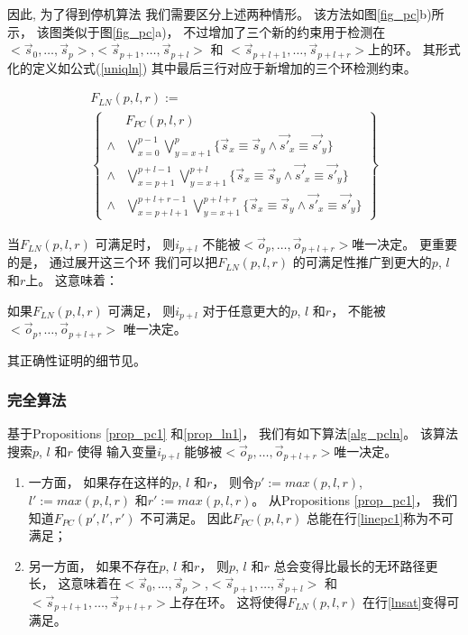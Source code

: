因此,
为了得到停机算法
我们需要区分上述两种情形。
该方法如图\ref{fig_pc}b)所示，
该图类似于图\ref{fig_pc}a)，
不过增加了三个新的约束用于检测在$<\vec{s}_{0},\dots,\vec{s}_{p}>$,$<\vec{s}_{p+1},\dots,\vec{s}_{p+l}>$ 和
$<\vec{s}_{p+l+1},\dots,\vec{s}_{p+l+r}>$上的环。
其形式化的定义如公式(\ref{uniqln})
其中最后三行对应于新增加的三个环检测约束。

\begin{multline}\label{uniqln}
F_{LN}(p,l,r):=\\
\left\{
\begin{array}{cc}
&F_{PC}(p,l,r)\\
\wedge&\bigvee_{x=0}^{p-1}\bigvee_{y=x+1}^{p} \{\vec{s}_x\equiv \vec{s}_y\wedge \vec{s'}_x\equiv \vec{s'}_y\} \\
\wedge&\bigvee_{x=p+1}^{p+l-1}\bigvee_{y=x+1}^{p+l} \{\vec{s}_x\equiv \vec{s}_y\wedge \vec{s'}_x\equiv \vec{s'}_y\} \\
\wedge&\bigvee_{x=p+l+1}^{p+l+r-1}\bigvee_{y=x+1}^{p+l+r} \{\vec{s}_x\equiv \vec{s}_y\wedge \vec{s'}_x\equiv \vec{s'}_y\}
\end{array}
\right\}
\end{multline}



当$F_{LN}(p,l,r)$ 可满足时，
则$i_{p+l}$ 不能被$<\vec{o}_{p},\dots,\vec{o}_{p+l+r}>$唯一决定。
更重要的是，
通过展开这三个环
我们可以把$F_{LN}(p,l,r)$ 的可满足性推广到更大的$p$, $l$ 和$r$上。
这意味着：


\begin{proposition}\label{prop_ln1}
如果$F_{LN}(p,l,r)$ 可满足，
则$i_{p+l}$ 对于任意更大的$p$, $l$ 和$r$，
不能被$<\vec{o}_{p},\dots,\vec{o}_{p+l+r}>$ 唯一决定。
\end{proposition}

其正确性证明的细节见\cite{ShenTCAD11}。

\subsubsection{完全算法}\label{subsub_algo}

基于Propositions \ref{prop_pc1} 和\ref{prop_ln1}，
我们有如下算法\ref{alg_pcln}。
该算法搜索$p$, $l$ 和$r$ 使得
输入变量$i_{p+l}$ 能够被$<\vec{o}_{p},\dots,\vec{o}_{p+l+r}>$唯一决定。
\begin{enumerate}
 \item
一方面，
如果存在这样的$p$, $l$ 和$r$，
则令$p':=max(p,l,r)$, $l':=max(p,l,r)$ 和$r':=max(p,l,r)$。
从Propositions \ref{prop_pc1}，
我们知道$F_{PC}(p',l',r')$ 不可满足。
因此$F_{PC}(p,l,r)$ 总能在行\ref{linepc1}称为不可满足；
 \item
另一方面，
如果不存在$p$, $l$ 和$r$，
则$p$, $l$ 和$r$ 总会变得比最长的无环路径更长，
这意味着在$<\vec{s}_{0},\dots,\vec{s}_{p}>$,$<\vec{s}_{p+1},\dots,\vec{s}_{p+l}>$ 和
$<\vec{s}_{p+l+1},\dots,\vec{s}_{p+l+r}>$上存在环。
这将使得$F_{LN}(p,l,r)$ 在行\ref{lnsat}变得可满足。
\end{enumerate}

